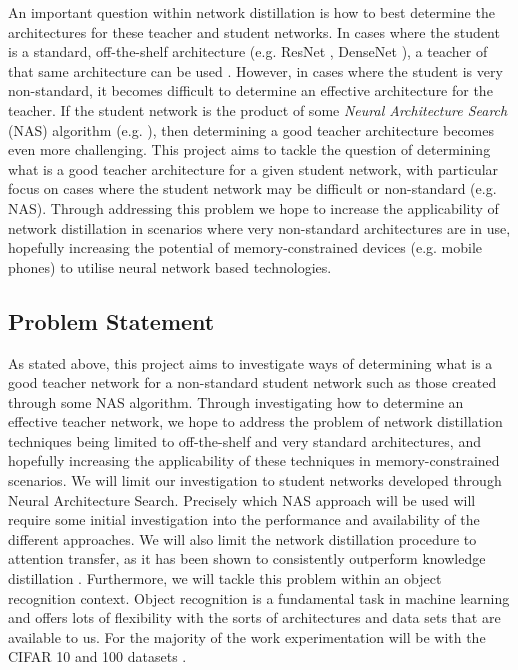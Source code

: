 \documentclass[a4paper,11pt]{article}
\begin{document}
An important question within network distillation is how to best determine the architectures for these teacher and student networks. In cases where the student is a standard, off-the-shelf architecture (e.g. ResNet \cite{he2016deep}, DenseNet \cite{huang2017densely}), a teacher of that same architecture can be used \cite{crowley2018moonshine}. However, in cases where the student is very non-standard, it becomes difficult to determine an effective architecture for the teacher. If the student network is the product of some \textit{Neural Architecture Search} (NAS) algorithm (e.g. \cite{liu2018darts} \cite{zoph2018learning}), then determining a good teacher architecture becomes even more challenging. This project aims to tackle the question of determining what is a good teacher architecture for a given student network, with particular focus on cases where the student network may be difficult or non-standard (e.g. NAS). Through addressing this problem we hope to increase the applicability of network distillation in scenarios where very non-standard architectures are in use, hopefully increasing the potential of memory-constrained devices (e.g. mobile phones) to utilise neural network based technologies. 

\subsection{Problem Statement}
As stated above, this project aims to investigate ways of determining what is a good teacher network for a non-standard student network such as those created through some NAS algorithm. Through investigating how to determine an effective teacher network, we hope to address the problem of network distillation techniques being limited to off-the-shelf and very standard architectures, and hopefully increasing the applicability of these techniques in memory-constrained scenarios. We will limit our investigation to student networks developed through Neural Architecture Search. Precisely which NAS approach will be used will require some initial investigation into the performance and availability of the different approaches. We will also limit the network distillation procedure to attention transfer, as it has been shown to consistently outperform knowledge distillation \cite{crowley2018moonshine}. Furthermore, we will tackle this problem within an object recognition context. Object recognition is a fundamental task in machine learning and offers lots of flexibility with the sorts of architectures and data sets that are available to us. For the majority of the work experimentation will be with the CIFAR 10 and 100 datasets \cite{krizhevsky2009learning}. 
\end{document}
